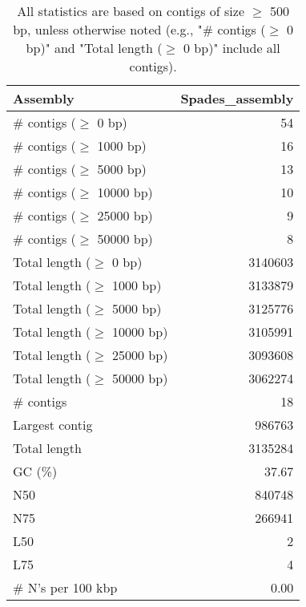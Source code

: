 \documentclass[12pt,a4paper]{article}
\begin{document}
\begin{table}[ht]
\begin{center}
\caption{All statistics are based on contigs of size $\geq$ 500 bp, unless otherwise noted (e.g., "\# contigs ($\geq$ 0 bp)" and "Total length ($\geq$ 0 bp)" include all contigs).}
\begin{tabular}{|l*{1}{|r}|}
\hline
Assembly & Spades\_assembly \\ \hline
\# contigs ($\geq$ 0 bp) & 54 \\ \hline
\# contigs ($\geq$ 1000 bp) & 16 \\ \hline
\# contigs ($\geq$ 5000 bp) & 13 \\ \hline
\# contigs ($\geq$ 10000 bp) & 10 \\ \hline
\# contigs ($\geq$ 25000 bp) & 9 \\ \hline
\# contigs ($\geq$ 50000 bp) & 8 \\ \hline
Total length ($\geq$ 0 bp) & 3140603 \\ \hline
Total length ($\geq$ 1000 bp) & 3133879 \\ \hline
Total length ($\geq$ 5000 bp) & 3125776 \\ \hline
Total length ($\geq$ 10000 bp) & 3105991 \\ \hline
Total length ($\geq$ 25000 bp) & 3093608 \\ \hline
Total length ($\geq$ 50000 bp) & 3062274 \\ \hline
\# contigs & 18 \\ \hline
Largest contig & 986763 \\ \hline
Total length & 3135284 \\ \hline
GC (\%) & 37.67 \\ \hline
N50 & 840748 \\ \hline
N75 & 266941 \\ \hline
L50 & 2 \\ \hline
L75 & 4 \\ \hline
\# N's per 100 kbp & 0.00 \\ \hline
\end{tabular}
\end{center}
\end{table}
\end{document}
